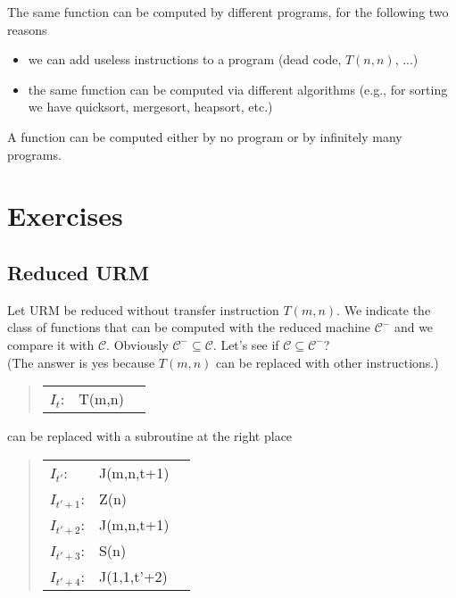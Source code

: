 \begin{remark}
  The same function can be computed by different programs, for the following two reasons

  \begin{itemize}
  \item we can add useless instructions to a program (dead code, $T(n,n)$, ...)

  \item the same function can be computed via different algorithms
    (e.g., for sorting we have quicksort, mergesort, heapsort, etc.)
  \end{itemize}

  A function can be computed either by no program or by infinitely many programs.
\end{remark}

\section {Exercises}

\subsection{Reduced URM}

Let URM be reduced without transfer instruction $T(m, n)$. We indicate the class
of functions that can be computed with the reduced machine $ \mathcal{C}^- $ and
we compare it with $ \mathcal{C} $. Obviously $ \mathcal{C}^- \subseteq \mathcal{C}
$. Let's see if $ \mathcal{C} \subseteq \mathcal{C}^-$? \\
(The answer is yes because $T(m, n)$ can be replaced with other instructions.)

\begin{quote}
  \begin{tabular}{lll}
    $I_t$: & T(m,n) \\
  \end{tabular}
\end{quote}

can be replaced with a subroutine at the right place

\begin{quote}
  \begin{tabular}{lll}
    $I_{t'}$:   & J(m,n,t+1)  \\
    $I_{t'+1}$: & Z(n)        \\
    $I_{t'+2}$: & J(m,n,t+1)  \\
    $I_{t'+3}$: & S(n)        \\
    $I_{t'+4}$: & J(1,1,t'+2) \\
  \end{tabular}
\end{quote}

